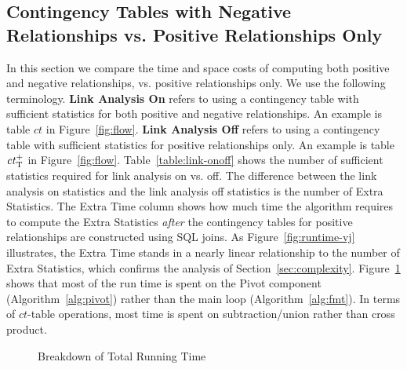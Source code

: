 \documentclass{sig-alternate-2013}
\newcommand{\ct}{\mathit{ct}}
\begin{document}
\subsection{Contingency Tables with Negative Relationships vs. Positive Relationships Only} 
In this section we compare the time and space costs of computing both positive and negative relationships, vs. positive relationships only.
We use the following terminology. \textbf{Link Analysis On} refers to using a contingency table with sufficient statistics for both positive and negative relationships. 
An example is table $\ct$ in Figure~\ref{fig:flow}. 
\textbf{Link Analysis Off} refers to using a contingency table with sufficient statistics for positive relationships only. An example is table $\ct_{\true}^{+}$ %
 in Figure~\ref{fig:flow}. Table~\ref{table:link-onoff} shows the  number of sufficient statistics required for link analysis on vs. off. The difference between the link analysis on statistics  and the link analysis off statistics is the number of Extra Statistics.
The Extra Time column shows how much time the \MJ algorithm requires to compute the Extra Statistics {\em after} the contingency tables for positive relationships are constructed using SQL joins. As Figure~\ref{fig:runtime-vj} illustrates, the Extra Time stands in a nearly linear relationship to the number of Extra Statistics, which confirms the analysis of Section~\ref{sec:complexity}. Figure~\ref{fig:breakdown-vj} shows that most of the \MJ run time is spent on the Pivot component (Algorithm~\ref{alg:pivot}) rather than the main loop (Algorithm~\ref{alg:fmt}). In terms of $\ct$-table operations, most time is spent on subtraction/union rather than cross product.


\begin{figure}[htbp]
\begin{center}

\caption{Breakdown of \MJ Total Running Time
\label{fig:breakdown-vj}}
\end{center}
\end{figure}
%
\end{document}
